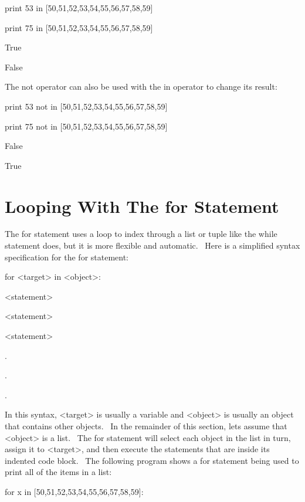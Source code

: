 \documentclass[12pt,twoside]{book}
\begin{document}
print 53 in [50,51,52,53,54,55,56,57,58,59]

print 75 in [50,51,52,53,54,55,56,57,58,59]

{\textbar}

True

False


\bigskip

The not operator can also be used with the in operator to change its
result:


\bigskip

print 53 not in [50,51,52,53,54,55,56,57,58,59]

print 75 not in [50,51,52,53,54,55,56,57,58,59]

{\textbar}

False

True

\section[Looping With The for Statement]{Looping With
The for Statement}
The for statement uses a loop to index through a list or tuple like the
while statement does, but it is more flexible and automatic. \ Here is
a simplified syntax specification for the for statement:


\bigskip

for {\textless}target{\textgreater} in {\textless}object{\textgreater}:

 {\textless}statement{\textgreater}

 {\textless}statement{\textgreater}

 {\textless}statement{\textgreater}

.

.

.


\bigskip

In this syntax, {\textless}target{\textgreater} is usually a variable
and {\textless}object{\textgreater} is usually an object that contains
other objects. \ In the remainder of this section, lets assume that
{\textless}object{\textgreater} is a list. \ The for statement will
select each object in the list in turn, assign it to
{\textless}target{\textgreater}, and then execute the statements that
are inside its indented code block. \ The following program shows a for
statement being used to print all of the items in a list:


\bigskip

for x in [50,51,52,53,54,55,56,57,58,59]:
\end{document}
